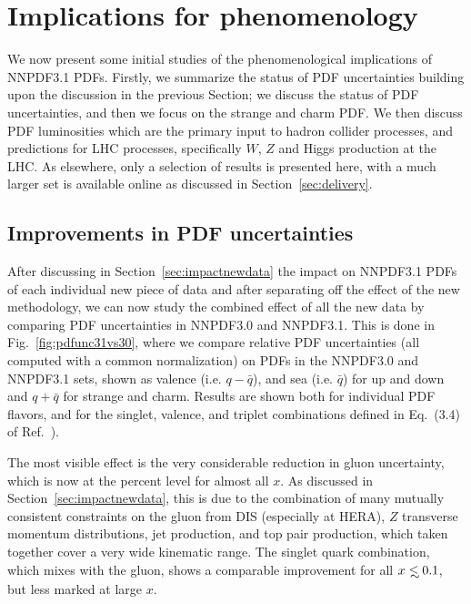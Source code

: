 \section{Implications for phenomenology}
\label{sec:pheno}

We now present some initial studies
of the phenomenological implications of NNPDF3.1 PDFs. 
%
Firstly, we summarize the status of PDF uncertainties building
upon the discussion in the previous Section; we discuss the status of 
PDF uncertainties, and then we focus on
the strange and charm PDF. We then discuss PDF luminosities which are
the primary input to hadron collider processes, and predictions for
LHC processes, specifically $W$, $Z$ and Higgs production at
the LHC. 
As elsewhere, only a selection of results is presented here, with
a much larger set is  available online 
as discussed in Section~\ref{sec:delivery}.

\subsection{Improvements in PDF uncertainties}

\label{sec:phenopdfs}

After discussing in Section~\ref{sec:impactnewdata} the impact on
NNPDF3.1 PDFs of each
individual new piece of data and after separating off the effect of the
new methodology, we can now study the combined effect of all the new data 
by comparing PDF uncertainties in NNPDF3.0 and NNPDF3.1. This is done in
Fig.~\ref{fig:pdfunc31vs30}, where we compare relative PDF uncertainties
(all computed with a common normalization) on PDFs in the NNPDF3.0 and
NNPDF3.1 sets, shown as valence (i.e. $q-\bar q$), and sea 
(i.e. $\bar q$) for up and down  and $q+\bar q$ for strange and
charm. Results are shown both for individual PDF flavors, and for the
singlet, valence, and triplet combinations defined in Eq.~(3.4) of
Ref.~\cite{Ball:2016neh}). 

The most visible effect is the very considerable reduction in gluon
uncertainty, which is now at the percent level for almost all $x$. As
discussed in  Section~\ref{sec:impactnewdata}, this is due to the
combination of many mutually consistent constraints on the gluon from
DIS (especially at HERA), $Z$ transverse momentum distributions, jet
production, and top pair production, which taken together cover a
very wide kinematic range. The singlet quark combination, which mixes
with the gluon, shows a comparable improvement for all $x\lsim 0.1$,
but less marked at large $x$.

